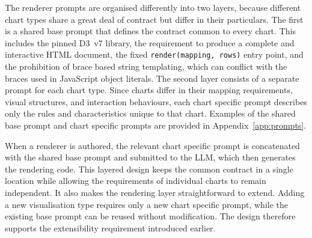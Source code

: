 The renderer prompts are organised differently into two layers, because different chart types share a great deal of contract but differ in their particulars. The first is a shared base prompt that defines the contract common to every chart. This includes the pinned D3~v7 library, the requirement to produce a complete and interactive HTML document, the fixed \texttt{render(mapping, rows)} entry point, and the prohibition of brace based string templating, which can conflict with the braces used in JavaScript object literals. The second layer consists of a separate prompt for each chart type. Since charts differ in their mapping requirements, visual structures, and interaction behaviours, each chart specific prompt describes only the rules and characteristics unique to that chart.  Examples of the shared base prompt and chart specific prompts are provided in Appendix~\ref{app:prompts}.

When a renderer is authored, the relevant chart specific prompt is concatenated with the shared base prompt and submitted to the LLM, which then generates the rendering code. This layered design keeps the common contract in a single location while allowing the requirements of individual charts to remain independent. It also makes the rendering layer straightforward to extend. Adding a new visualisation type requires only a new chart specific prompt, while the existing base prompt can be reused without modification. The design therefore supports the extensibility requirement introduced earlier.





